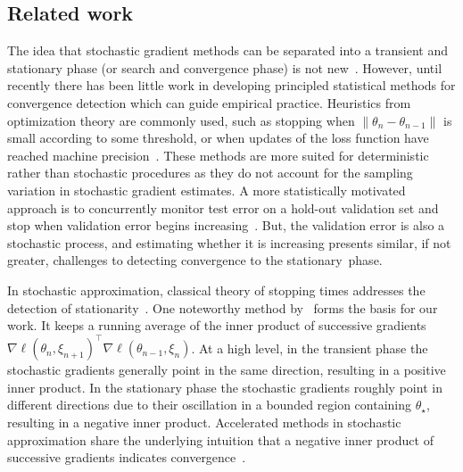 \documentclass[conference]{IEEEtran}
\begin{document}
\subsection{Related work}

The idea that stochastic gradient methods can be separated into a transient and stationary phase (or search and convergence phase) is not new~\cite{Article:Murata_1998}. 
However, until recently there has been little work in developing principled statistical methods for convergence detection which can guide empirical practice. Heuristics from optimization theory are commonly used, such as stopping when 
$\| \theta_{n} - \theta_{n-1} \|$ is small according to some threshold, or when updates of the loss function have reached machine precision~\cite{Article:Bottou_SIREV18, BooK:Ermoliev_1988}. These methods are more suited for deterministic rather than stochastic procedures as they do not account for the sampling variation in stochastic gradient estimates.
A more statistically motivated approach is to concurrently monitor test error on a hold-out validation set and stop when validation error begins increasing~\cite{Proc:Blum_COLT99,Collect:Bottou_LNCS12}.
But, the validation error is also a stochastic process, and estimating whether it is increasing presents similar, if not greater, challenges to detecting convergence to the stationary~phase.

In stochastic approximation, classical theory of stopping times addresses the detection of stationarity~\cite{Article:Pflug_1990,Proc:Yin_1989}.
One noteworthy method by~\cite{Article:Pflug_1990} forms the basis for our work. 
It keeps a running average of the inner product of successive gradients $\nabla \ell ( \theta_{n}, \xi_{n+1})^\top \nabla \ell ( \theta_{n-1}, \xi_{n} )$.
At a high level, in the transient phase the stochastic gradients generally point in the same direction, resulting in a positive inner product.
In the stationary phase the stochastic gradients roughly point in different directions due to their oscillation in a bounded region containing $\theta_\star$, resulting in a negative inner product.
Accelerated methods in stochastic approximation share the underlying intuition that a negative inner product of successive gradients indicates convergence~\cite{Article:Delyon_SIOPT93, Article:Kesten_AOMS58, Proc:Roux_NIPS12}.
\end{document}
